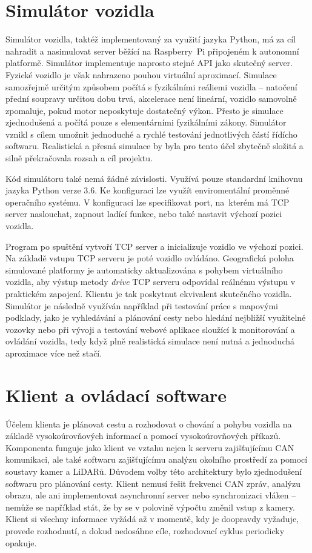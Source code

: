 \documentclass[czech, bachelor]{diploma}
\begin{document}
\chapter{Simulátor vozidla}

Simulátor vozidla, taktéž implementovaný za využití jazyka Python, má za cíl nahradit a nasimulovat server běžící na Raspberry~Pi
připojeném k autonomní platformě. Simulátor implementuje naprosto stejné API jako skutečný server. Fyzické vozidlo je však
nahrazeno pouhou virtuální aproximací. Simulace samozřejmě určitým způsobem počítá s fyzikálními reáliemi vozidla -- natočení
přední soupravy určitou dobu trvá, akcelerace není lineární, vozidlo samovolně zpomaluje, pokud motor neposkytuje dostatečný
výkon. Přesto je simulace zjednodušená a počítá pouze s elementárními fyzikálními zákony. Simulátor vznikl s cílem umožnit
jednoduché a rychlé testování jednotlivých částí řídícho softwaru. Realistická a přesná simulace by byla pro tento účel zbytečně
složitá a silně překračovala rozsah a cíl projektu.

Kód simulátoru také nemá žádné závislosti. Využívá pouze standardní knihovnu jazyka Python verze 3.6. Ke konfiguraci lze využít
enviromentální proměnné operačního systému. V konfiguraci lze specifikovat port, na~kterém má TCP server naslouchat, zapnout
ladící funkce, nebo také nastavit výchozí pozici vozidla.

Program po spuštění vytvoří TCP server a inicializuje vozidlo ve výchozí pozici. Na základě vstupu TCP serveru je poté vozidlo
ovládáno. Geografická poloha simulované platformy je automaticky aktualizována s pohybem virtuálního vozidla, aby výstup metody
\emph{drive} TCP serveru odpovídal reálnému výstupu v praktickém zapojení. Klientu je tak poskytnut ekvivalent skutečného vozidla.
Simulátor je následně využíván například při testování práce s mapovými podklady, jako je vyhledávání a plánování cesty nebo
hledání nejbližší využitelné vozovky nebo při vývoji a testování webové aplikace sloužící k monitorování a ovládání vozidla, tedy
když plně realistická simulace není nutná a jednoduchá aproximace více než stačí.

\chapter{Klient a ovládací software}

Účelem klienta je plánovat cestu a rozhodovat o chování a pohybu vozidla na základě vysokoúrovňových informací a pomocí
vysokoúrovňových příkazů. Komponenta funguje jako klient ve vztahu nejen k serveru zajišťujícímu CAN komunikaci, ale také
softwaru zajišťujícímu analýzu okolního prostředí za pomocí soustavy kamer a LiDARů. Důvodem volby této architektury bylo
zjednodušení softwaru pro plánování cesty. Klient nemusí řešit frekvenci CAN zpráv, analýzu obrazu, ale ani implementovat
asynchronní server nebo synchronizaci vláken -- nemůže se například stát, že by se v polovině výpočtu změnil vstup z kamery.
Klient si všechny informace vyžádá až v momentě, kdy je doopravdy vyžaduje, provede rozhodnutí, a dokud nedosáhne cíle,
rozhodovací cyklus periodicky opakuje.
\end{document}
